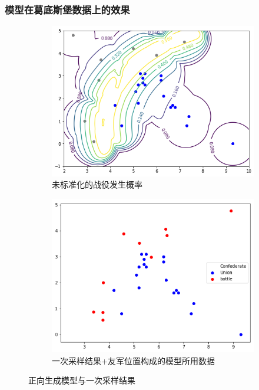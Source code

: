 \documentclass{beamer}
\begin{document}
\begin{frame}

\frametitle{模型在葛底斯堡数据上的效果}

\begin{figure}[htb]
  \centering
  \begin{subfigure}[b]{0.49\linewidth}
    \includegraphics[width=\linewidth]{gettysburg-forward.png}
    \caption{未标准化的战役发生概率}
  \end{subfigure}
  \begin{subfigure}[b]{0.49\linewidth}
    \includegraphics[width=\linewidth]{gettysburg-sample.png}
    \caption{一次采样结果+友军位置构成的模型所用数据}
  \end{subfigure}
  \caption{正向生成模型与一次采样结果}
  \label{fig:gettysburgTwo}
\end{figure}

\end{frame}
\end{document}
